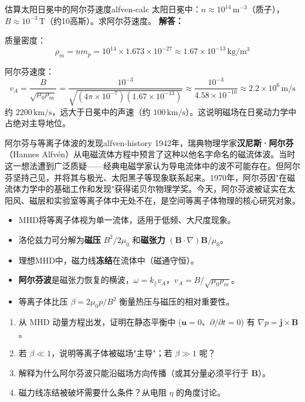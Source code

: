 \documentclass[12pt,a4paper,openany,oneside]{book}
\newcommand{\vect}[1]{\bm{#1}}
\newcommand{\grad}{\nabla}
\newcommand{\difficulty}[1]{\marginnote{\textcolor{red}{\textbf{[#1]}}}}
\begin{document}
\begin{example}{估算太阳日冕中的阿尔芬速度}{alfven-calc}
\difficulty{基础}
太阳日冕中：$n \approx 10^{14}\,\mathrm{m}^{-3}$（质子），$B \approx 10^{-3}\,\mathrm{T}$（约10高斯）。求阿尔芬速度。
\tcblower
\textbf{解答：}

质量密度：
\[
\rho_m = n m_p = 10^{14} \times 1.673\times 10^{-27} \approx 1.67\times 10^{-13}\,\mathrm{kg/m^3}
\]

阿尔芬速度：
\[
v_A = \frac{B}{\sqrt{\mu_0\rho_m}} = \frac{10^{-3}}{\sqrt{(4\pi\times 10^{-7})(1.67\times 10^{-13})}} \approx \frac{10^{-3}}{4.58\times 10^{-10}} \approx 2.2\times 10^{6}\,\mathrm{m/s}
\]
约 $2200\,\mathrm{km/s}$，远大于日冕中的声速（约 $100\,\mathrm{km/s}$）。这说明磁场在日冕动力学中占绝对主导地位。
\end{example}

\begin{history}{阿尔芬与等离子体波的发现}{alfven-history}
1942年，瑞典物理学家\textbf{汉尼斯·阿尔芬}（Hannes Alfv\'{e}n）从电磁流体方程中预言了这种以他名字命名的磁流体波。当时这一想法遭到广泛质疑——经典电磁学家认为导电流体中的波不可能存在。但阿尔芬坚持己见，并将其与极光、太阳黑子等现象联系起来。1970年，阿尔芬因"在磁流体力学中的基础工作和发现"获得诺贝尔物理学奖。今天，阿尔芬波被证实在太阳风、磁层和实验室等离子体中无处不在，是空间等离子体物理的核心研究对象。
\end{history}

\begin{chapterreview}
\begin{itemize}
\item MHD将等离子体视为单一流体，适用于低频、大尺度现象。
\item 洛伦兹力可分解为\textbf{磁压} $B^2/2\mu_0$ 和\textbf{磁张力} $(\vect{B}\cdot\grad)\vect{B}/\mu_0$。
\item 理想MHD中，磁力线\textbf{冻结}在流体中（磁通守恒）。
\item \textbf{阿尔芬波}是磁张力恢复的横波，$\omega = k_\parallel v_A$，$v_A = B/\sqrt{\mu_0\rho_m}$。
\item 等离子体比压 $\beta = 2\mu_0 p/B^2$ 衡量热压与磁压的相对重要性。
\end{itemize}
\end{chapterreview}

\begin{miniquiz}
\begin{enumerate}
\item 从 MHD 动量方程出发，证明在静态平衡中 ($\vect{u}=0$、$\partial/\partial t=0$) 有 $\grad p = \vect{j}\times\vect{B}$。
\item 若 $\beta \ll 1$，说明等离子体被磁场"主导"；若 $\beta \gg 1$ 呢？
\item 解释为什么阿尔芬波只能沿磁场方向传播（或其分量必须平行于 $\vect{B}$）。
\item 磁力线冻结被破坏需要什么条件？从电阻 $\eta$ 的角度讨论。
\end{enumerate}
\end{miniquiz}
\end{document}
